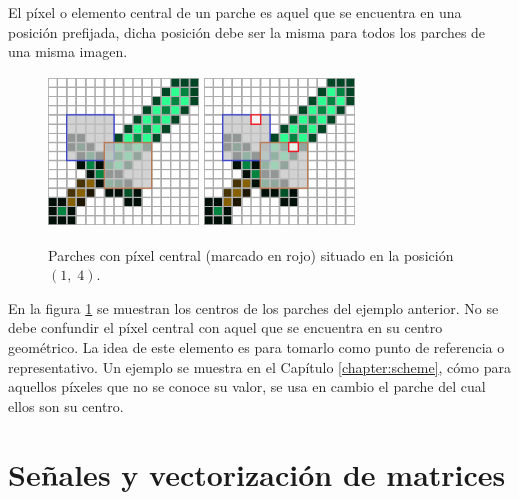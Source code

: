 \begin{definition}
	El p\'ixel o elemento central de un parche es aquel que se encuentra en una posici\'on prefijada, dicha posici\'on debe ser la misma para todos los parches de una misma imagen.
\end{definition}

\begin{figure}[h]
	\centering
	\includegraphics[width=4cm, height=4cm]{Graphics/diamon_sword_with_patches.png}
	\hspace{1cm}
	\includegraphics[width=4cm, height=4cm]{Graphics/diamon_sword_with_patches_and_centers.png}
	\caption{Parches con p\'ixel central (marcado en rojo) situado en la posici\'on $(1,\;4)$.}
	\label{ex:patch_center}
\end{figure}

En la figura \ref{ex:patch_center} se muestran los centros de los parches del ejemplo anterior. No se debe confundir el p\'ixel central con aquel que se encuentra en su centro geom\'etrico. La idea de este elemento es para tomarlo como punto de referencia o representativo. Un ejemplo se muestra en el Cap\'itulo \ref{chapter:scheme}, c\'omo para aquellos p\'ixeles que no se conoce su valor, se usa en cambio el parche del cual ellos son su centro.

\section{Señales y vectorizaci\'on de matrices}\label{sec:signals}

